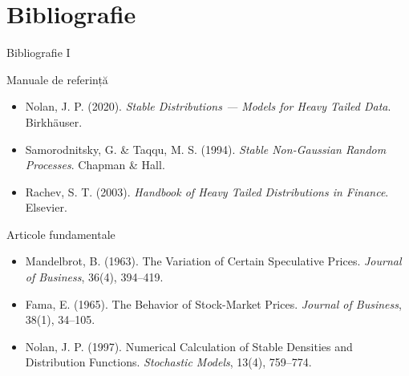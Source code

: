 \documentclass[9pt, aspectratio=169, t]{beamer}
\theoremstyle{definition}
\newenvironment{cminipage}[1]{%
    \par\noindent\hfill\begin{minipage}{#1}\ignorespaces
}{%
    \end{minipage}\hfill\null\par
}
\begin{document}
\section{Bibliografie}

\begin{frame}{Bibliografie I}
    \begin{cminipage}{0.95\textwidth}
    \begin{block}{Manuale de referință}
        {\small
        \begin{itemize}\setlength{\itemsep}{0pt}
            \item Nolan, J. P. (2020). \textit{Stable Distributions --- Models for Heavy Tailed Data}. Birkh\"{a}user.
            \item Samorodnitsky, G. \& Taqqu, M. S. (1994). \textit{Stable Non-Gaussian Random Processes}. Chapman \& Hall.
            \item Rachev, S. T. (2003). \textit{Handbook of Heavy Tailed Distributions in Finance}. Elsevier.
        \end{itemize}
        }
    \end{block}

    \begin{exampleblock}{Articole fundamentale}
        {\small
        \begin{itemize}\setlength{\itemsep}{0pt}
            \item Mandelbrot, B. (1963). The Variation of Certain Speculative Prices. \textit{Journal of Business}, 36(4), 394--419.
            \item Fama, E. (1965). The Behavior of Stock-Market Prices. \textit{Journal of Business}, 38(1), 34--105.
            \item Nolan, J. P. (1997). Numerical Calculation of Stable Densities and Distribution Functions. \textit{Stochastic Models}, 13(4), 759--774.
        \end{itemize}
        }
    \end{exampleblock}
    \end{cminipage}
\end{frame}
\end{document}
